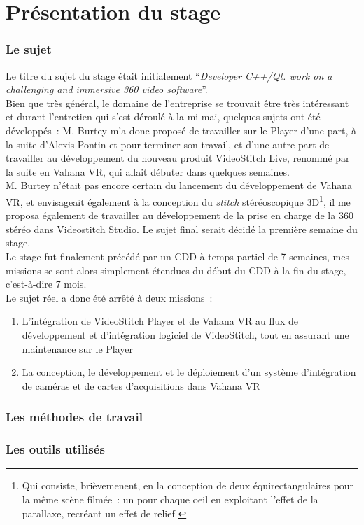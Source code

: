 \chapter{Présentation du stage}

\subsection{Le sujet}
Le titre du sujet du stage était initialement \enquote{\textit{Developer C++/Qt.
work on a challenging and immersive 360 video software}}.\\
Bien que très général, le domaine de l'entreprise se trouvait être très intéressant
et durant l'entretien qui s'est déroulé à la mi-mai, quelques sujets ont été
développés~: M. Burtey m'a donc proposé de travailler sur le Player d'une part,
à la suite d'Alexis Pontin et pour terminer son travail, et d'une autre part de
travailler au développement du nouveau produit VideoStitch Live, renommé par la
suite en Vahana VR, qui allait débuter dans quelques semaines.\\
M. Burtey n'était pas encore certain du lancement du développement de Vahana VR, 
et envisageait également à la conception du \textit{stitch} stéréoscopique 3D\footnote{Qui
consiste, brièvemenent, en la conception de deux équirectangulaires pour la même
scène filmée~: un pour chaque oeil en exploitant l'effet de la parallaxe, recréant 
un effet de relief\cite{videostitch-stereo}
\cite{image-stereoscopique}}, il me proposa également de travailler au développement
de la prise en charge de la 360 stéréo dans Videostitch Studio. Le sujet final serait
décidé la première semaine du stage.\\
\newline
Le stage fut finalement précédé par un CDD à temps partiel de 7 semaines, mes missions
se sont alors simplement étendues du début du CDD à la fin du stage, c'est-à-dire 
7 mois.\\
Le sujet réel a donc été arrêté à deux missions~:
\begin{enumerate}
\item L'intégration de VideoStitch Player et de Vahana VR au flux de développement et d'intégration
logiciel de VideoStitch, tout en assurant une maintenance sur le Player
\item La conception, le développement et le déploiement d'un système
d'intégration de caméras et de cartes d'acquisitions dans Vahana VR
\end{enumerate}

\subsection{Les méthodes de travail}

\subsection{Les outils utilisés}
